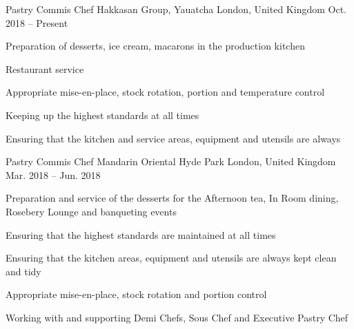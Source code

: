 

\begin{cventries}

  \cventry
    {Pastry Commis Chef} %
    {Hakkasan Group, Yauatcha} %
    {London, United Kingdom} %
    {Oct. 2018 -- Present} %
    {
      \begin{cvitems} %
        \item {Preparation of desserts, ice cream, macarons in the production kitchen}
        \item {Restaurant service}
        \item {Appropriate mise-en-place, stock rotation, portion and temperature control}
        \vfill\null
        \columnbreak
        \item {Keeping up the highest standards at all times}
        \item {Ensuring that the kitchen and service areas, equipment and utensils are always}
      \end{cvitems}
    }

  \cventry
    {Pastry Commis Chef} %
    {Mandarin Oriental Hyde Park} %
    {London, United Kingdom} %
    {Mar. 2018 -- Jun. 2018} %
    {
      \begin{cvitems} %
        \item {Preparation and service of the desserts for the Afternoon tea, In Room dining, Rosebery Lounge and banqueting events}
        \item {Ensuring that the highest standards are maintained at all times}
        \item {Ensuring that the kitchen areas, equipment and utensils are always kept clean and tidy}
        \vfill\null
        \columnbreak
        \item {Appropriate mise-en-place, stock rotation and portion control}
        \item {Working with and supporting Demi Chefs, Sous Chef and Executive Pastry Chef}
      \end{cvitems}
    }


\end{cventries}
